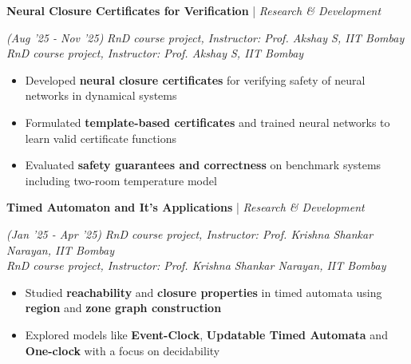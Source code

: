 \documentclass[10pt]{article}
\newcommand{\xfill}[2][1ex]{
	\dimen0=#2\advance\dimen0 by #1
	\leaders\hrule height \dimen0 depth -#1\hfill
}
\renewcommand{\section}[1]{
	\vspace{5pt}
	{\color{Blue}{\Large\scshape\raggedright #1\xfill[0pt]{0.5pt}}}
}
\renewcommand{\subsection}[4]{
	\def\temp{#4}
	\vspace{2pt}
	{
		\large
		{\color{Green} \textbf{#1}} | {\sl #2} \filldate{#3}
		\ifx\temp\empty
		\else
		{
			\\[0.098em]
			\fontsize{10.5}{13.2}\selectfont
			\sl #4
		}
		\fi
	}
}
\newcommand{\filldate}[1]{\strut\hfill {\small \textit{(#1)}}}
\begin{document}
\subsection{Neural Closure Certificates for Verification}{Research \& Development}{Aug '25 - Nov '25}{\textit{RnD course project, Instructor: Prof. Akshay S, IIT Bombay}}
\begin{itemize}
\item Developed \textbf{neural closure certificates} for verifying safety of neural networks in dynamical systems
\item Formulated \textbf{template-based certificates} and trained neural networks to learn valid certificate functions
\item Evaluated \textbf{safety guarantees and correctness} on benchmark systems including two-room temperature model
\end{itemize}

\vspace{-3px}

\subsection{Timed Automaton and It's Applications}{Research \& Development}{Jan '25 - Apr '25}{\textit{RnD course project, Instructor: Prof. Krishna Shankar Narayan, IIT Bombay}}
\begin{itemize}
    \item Studied \textbf{reachability} and \textbf{closure properties} in timed automata using \textbf{region} and \textbf{zone graph construction}
    \item Explored models like \textbf{Event-Clock}, \textbf{Updatable Timed Automata} and \textbf{One-clock} with a focus on decidability
\end{itemize}

\vspace{-8px}

\newpage
{}

\section{Key Projects}
\end{document}
